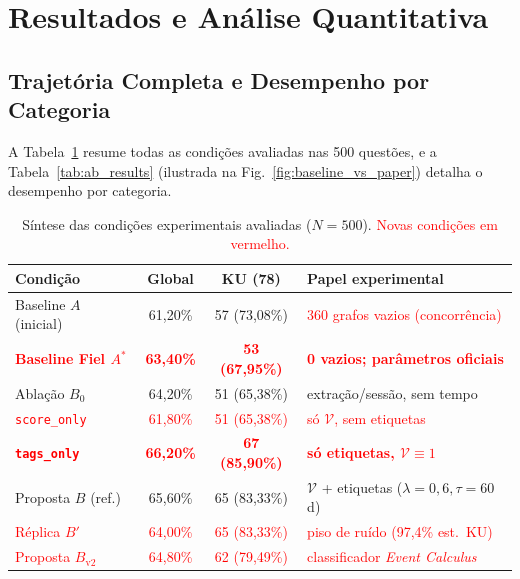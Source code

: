 \documentclass[10pt,conference,twocolumn]{IEEEtran}
\newcommand{\novo}[1]{\textcolor{red}{#1}}
\begin{document}
\section{Resultados e Análise Quantitativa}

\subsection{Trajetória Completa e Desempenho por Categoria}
A Tabela~\ref{tab:evolucao} resume todas as condições avaliadas nas 500 questões, e a Tabela~\ref{tab:ab_results} (ilustrada na Fig.~\ref{fig:baseline_vs_paper}) detalha o desempenho por categoria.

\begin{table}[!t]
\caption{Síntese das condições experimentais avaliadas ($N = 500$). \novo{Novas condições em vermelho.}}
\label{tab:evolucao}
\centering
\footnotesize
\setlength{\tabcolsep}{3.2pt}
\begin{tabular}{lccp{2.6cm}}
\toprule
\textbf{Condição} & \textbf{Global} & \textbf{KU (78)} & \textbf{Papel experimental} \\
\midrule
Baseline $A$ (inicial) & 61,20\% & 57 (73,08\%) & \novo{360 grafos vazios (concorrência)} \\
\novo{\textbf{Baseline Fiel $A^*$}} & \novo{\textbf{63,40\%}} & \novo{\textbf{53 (67,95\%)}} & \novo{\textbf{0 vazios; parâmetros oficiais}} \\
Ablação $B_0$ & 64,20\% & 51 (65,38\%) & extração/sessão, sem tempo \\
\novo{\texttt{score\_only}} & \novo{61,80\%} & \novo{51 (65,38\%)} & \novo{só $\mathcal{V}$, sem etiquetas} \\
\novo{\textbf{\texttt{tags\_only}}} & \novo{\textbf{66,20\%}} & \novo{\textbf{67 (85,90\%)}} & \novo{\textbf{só etiquetas, $\mathcal{V}\equiv 1$}} \\
Proposta $B$ (ref.) & 65,60\% & 65 (83,33\%) & $\mathcal{V}$ + etiquetas ($\lambda=0{,}6, \tau=60$d) \\
\novo{Réplica $B'$} & \novo{64,00\%} & \novo{65 (83,33\%)} & \novo{piso de ruído (97,4\% est.\ KU)} \\
\novo{Proposta $B_{\text{v2}}$} & \novo{64,80\%} & \novo{62 (79,49\%)} & \novo{classificador \textit{Event Calculus}} \\
\bottomrule
\end{tabular}
\end{table}
\end{document}
